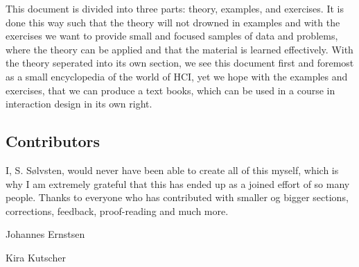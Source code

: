This document is divided into three parts: theory, examples, and exercises. It is done this way such that the theory will not drowned in examples and with the exercises we want to provide small and focused samples of data and problems, where the theory can be applied and that the material is learned effectively. With the theory seperated into its own section, we see this document first and foremost as a small encyclopedia of the world of HCI, yet we hope with the examples and exercises, that we can produce a text books, which can be used in a course in interaction design in its own right.

\newpage
\subsection{Contributors}
I, S. Sølvsten, would never have been able to create all of this myself, which is why I am extremely grateful that this has ended up as a joined effort of so many people. Thanks to everyone who has contributed with smaller og bigger sections, corrections, feedback, proof-reading and much more.

\begin{multicols}{2}
  Johannes Ernstsen

  \hfill
  \columnbreak
  
  Kira Kutscher
\end{multicols}

